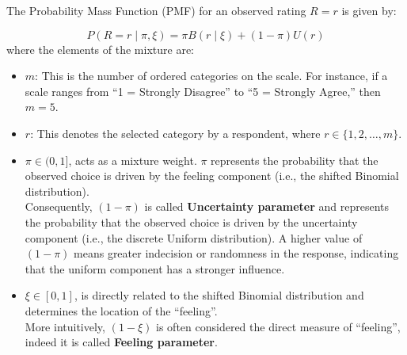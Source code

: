 \documentclass[
  letterpaper,
  DIV=11,
  numbers=noendperiod]{scrartcl}
\begin{document}
The Probability Mass Function (PMF) for an observed rating \(R=r\) is
given by:

\[
P(R = r \mid \pi,\xi) = \pi B(r \mid\xi) + (1-\pi)U(r)
\] where the elements of the mixture are:

\begin{itemize}
\item
  \(m\): This is the number of ordered categories on the scale. For
  instance, if a scale ranges from ``1 = Strongly Disagree'' to ``5 =
  Strongly Agree,'' then \(m=5\).
\item
  \(r\): This denotes the selected category by a respondent, where
  \(r\in \{ 1,2,…,m\}\).
\item
  \(\pi \in (0,1]\), acts as a mixture weight. \(\pi\) represents the
  probability that the observed choice is driven by the feeling
  component (i.e., the shifted Binomial distribution).\\
  Consequently, \((1−\pi)\) is called \textbf{Uncertainty parameter} and
  represents the probability that the observed choice is driven by the
  uncertainty component (i.e., the discrete Uniform distribution). A
  higher value of \((1−\pi)\) means greater indecision or randomness in
  the response, indicating that the uniform component has a stronger
  influence.
\item
  \(\xi \in [0,1]\), is directly related to the shifted Binomial
  distribution and determines the location of the ``feeling''.\\
  More intuitively, \((1−\xi)\) is often considered the direct measure
  of ``feeling'', indeed it is called \textbf{Feeling parameter}.


\end{itemize}
\end{document}
